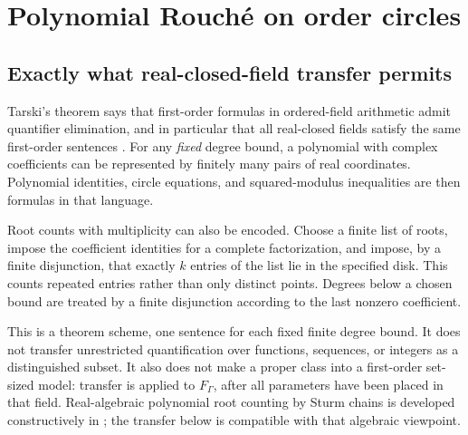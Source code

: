 \documentclass[11pt,letterpaper]{article}
\numberwithin{equation}{section}
\theoremstyle{definition}
\theoremstyle{remark}\newtheorem{remark}[theorem]{Remark}
\begin{document}
\section{Polynomial Rouch\'e on order circles}\label{sec:transfer}

\subsection{Exactly what real-closed-field transfer permits}
Tarski's theorem says that first-order formulas in ordered-field
arithmetic admit quantifier elimination, and in particular that all
real-closed fields satisfy the same first-order sentences
\cite{TarskiSurvey}. For any \emph{fixed} degree bound, a polynomial with
complex coefficients can be represented by finitely many pairs of real
coordinates. Polynomial identities, circle equations, and squared-modulus
inequalities are then formulas in that language.

Root counts with multiplicity can also be encoded. Choose a finite list
of roots, impose the coefficient identities for a complete factorization,
and impose, by a finite disjunction, that exactly $k$ entries of the list
lie in the specified disk. This counts repeated entries rather than
only distinct points. Degrees below a chosen bound are treated by a
finite disjunction according to the last nonzero coefficient.

This is a theorem scheme, one sentence for each fixed finite degree
bound. It does not transfer unrestricted quantification over functions,
sequences, or integers as a distinguished subset. It also does not make
a proper class into a first-order set-sized model: transfer is applied
to $F_\Gamma$, after all parameters have been placed in that field.
Real-algebraic polynomial root counting by Sturm chains is developed
constructively in \cite{Eisermann}; the transfer below is compatible
with that algebraic viewpoint.
\end{document}
